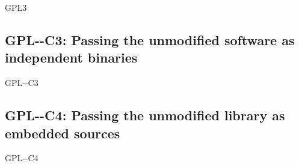 \begin{license}{GPL3}
\subsection{GPL-\ver-C3: Passing the unmodified software as independent binaries} 
\begin{lsuc}{GPL-\ver-C3}

  \useCaseThree{\ver}
  \coversThree

  \begin{lsucrequires}
    \lsucmandatory{\keepLicenseElements}
    \lsucmandatory{\gplthreeEnsureCopyrightNoticeBinary}
    \lsucmandatory{\giveLicense}\passingFilesCorrectly  
    \lsucmandatory{\makeUnmodifiedSourceAvailable}
    \lsucmandatory{\describeHowToGetSource}
    \lsucmandatory{\retainCopyrightNotices}
    \lsucoptional{\addToDocumentation}
  \end{lsucrequires}

  \begin{lsucprohibits}
    \lsucitem{\noPatentLitigation}
  \end{lsucprohibits}
\end{lsuc}

\subsection{GPL-\ver-C4: Passing the unmodified library as embedded sources}
\begin{lsuc}{GPL-\ver-C4}

  \useCaseFour{\ver}
  \coversFour

  \begin{lsucrequires}
    \lsucmandatory{\keepLicenseElements}
    \lsucmandatory{\gplthreeEnsureCopyrightNoticeSource}
    \lsucmandatory{\giveLicense}\passingFilesCorrectly
    \lsucmandatory{\retainCopyrightNotices}
    \lsucmandatory{\addToCopyrightDialogLib}
    \lsucmandatory{\arrangeEnclosingSources}
    \lsucoptional{\addToDocumentation}
  \end{lsucrequires}

  \begin{lsucprohibits}
    \lsucitem{\noPatentLitigation}
  \end{lsucprohibits}
\end{lsuc}


\end{license}
